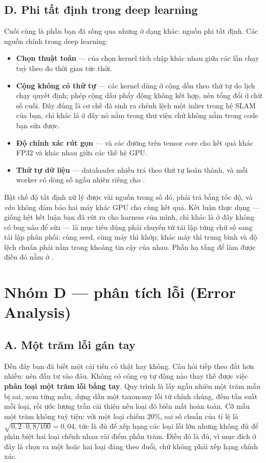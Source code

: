 \documentclass[../../deep_learning.tex]{subfiles}
\begin{document}
\subsection{D. Phi tất định trong deep learning}
Cuối cùng là phần bạn đã sống qua nhưng ở dạng khác: nguồn phi tất định. Các nguồn chính trong deep learning:

\begin{itemize}
\item \textbf{Chọn thuật toán} ---  của  chọn kernel tích chập khác nhau giữa các lần chạy tuỳ theo đo thời gian tức thời.
\item \textbf{Cộng không có thứ tự} --- các kernel dùng  ở  cộng dồn theo thứ tự do lịch chạy quyết định; phép cộng dấu phẩy động không kết hợp, nên tổng đổi ở chữ số cuối. Đây đúng là cơ chế đã sinh ra chênh lệch một inlier trong hệ SLAM của bạn, chỉ khác là ở đây nó nằm trong thư viện chứ không nằm trong code bạn sửa được.
\item \textbf{Độ chính xác rút gọn} ---  và các đường  trên tensor core cho kết quả khác FP32 và khác nhau giữa các thế hệ GPU.
\item \textbf{Thứ tự dữ liệu} --- dataloader nhiều  trả  theo thứ tự hoàn thành, và mỗi worker có dòng số ngẫu nhiên riêng cho .
\end{itemize} Bật chế độ tất định xử lý được vài nguồn trong số đó, phải trả bằng tốc độ, và \emph{vẫn} không đảm bảo hai máy khác GPU cho cùng kết quả. Kết luận thực dụng — giống hệt kết luận bạn đã rút ra cho harness của mình, chỉ khác là ở đây không có bug nào để sửa — là mục tiêu đúng phải chuyển từ tái lập từng chữ số sang tái lập phân phối: cùng seed, cùng máy thì khớp; khác máy thì trung bình và độ lệch chuẩn phải nằm trong khoảng tin cậy của nhau. Phần hạ tầng để làm được điều đó nằm ở .

\section{Nhóm D --- phân tích lỗi (Error Analysis)}
\subsection{A. Một trăm lỗi gán tay}
Đến đây bạn đã biết một cải tiến có thật hay không. Câu hỏi tiếp theo đắt hơn nhiều: nên đầu tư vào đâu. Không có công cụ tự động nào thay thế được việc \textbf{phân loại một trăm lỗi bằng tay}. Quy trình là lấy ngẫu nhiên một trăm mẫu bị sai, xem từng mẫu, dựng dần một taxonomy lỗi từ chính chúng, đếm tần suất mỗi loại, rồi ước lượng trần cải thiện nếu loại đó biến mất hoàn toàn. Cỡ mẫu một trăm không tuỳ tiện: với một loại chiếm 20\%, sai số chuẩn của tỉ lệ là \(\sqrt{0{,}2 \cdot 0{,}8/100} = 0{,}04\), tức là đủ để xếp hạng các loại lỗi lớn nhưng không đủ để phân biệt hai loại chênh nhau vài điểm phần trăm. Điều đó là đủ, vì mục đích ở đây là chọn ra một hoặc hai loại đáng theo đuổi, chứ không phải xếp hạng chính xác.
\end{document}
